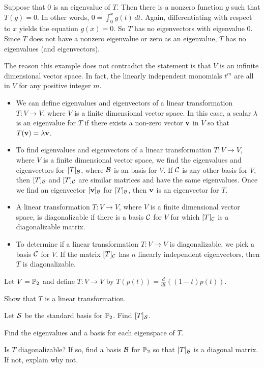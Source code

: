 \item Suppose that $0$ is an eigenvalue of $T$. Then there is a nonzero function $g$ such that $T(g) = 0$. In other words, $0 = \int_0^x g(t) \, dt$. Again, differentiating with respect to $x$ yields the equation $g(x) = 0$. So $T$ has no eigenvectors with eigenvalue $0$. Since $T$ does not have a nonzero eigenvalue or zero as an eigenvalue, $T$ has no eigenvalues (and eigenvectors). 

\item The reason this example does not contradict the statement is that $V$ is an infinite dimensional vector space. In fact, the linearly independent monomials $t^m$ are all in $V$ for any positive integer $m$. 

\ea




\label{sec:eigen_trans_summ}

\begin{itemize}
\item We can define eigenvalues and eigenvectors of a linear transformation $T : V \to V$, where $V$ is a finite dimensional vector space. In this case, a scalar $\lambda$ is an eigenvalue for $T$ if there exists a non-zero vector $\mathbf{v}$ in $V$ so that $T(\mathbf{v}) = \lambda \mathbf{v}$.   
\item To find eigenvalues and eigenvectors of a linear transformation $T : V \to V$, where $V$ is a finite dimensional vector space, we find the eigenvalues and eigenvectors for $[T]_{\mathcal{B}}$, where $\mathcal{B}$ is an basis for $V$. If $\mathcal{C}$ is any other basis for $V$, then $[T]_{\mathcal{B}}$ and $[T]_{\mathcal{C}}$ are similar matrices and have the same eigenvalues. Once we find an eigenvector $[\mathbf{v}]_{\mathcal{B}}$ for $[T]_{\mathcal{B}}$, then $\mathbf{v}$ is an eigenvector for $T$. 
\item A linear transformation $T: V \to V$, where $V$ is a finite dimensional vector space, is diagonalizable if there is a basis $\mathcal{C}$ for $V$ for which $[T]_{\mathcal{C}}$ is a diagonalizable matrix. 
\item To determine if a linear transformation $T : V \to V$ is diagonalizable, we pick a basis $\mathcal{C}$ for $V$. If the matrix $[T]_{\mathcal{C}}$ has $n$ linearly independent eigenvectors, then $T$ is diagonalizable. 
\end{itemize}

\label{sec:eigen_trans_exer}
\be
\item Let $V = \mathbb{P}_2$ and define $T: V \to V$ by $T(p(t)) = \frac{d}{dt} \left((1-t)p(t)\right)$. 
	\ba
	\item Show that $T$ is a linear transformation.
	\item Let $\mathcal{S}$ be the standard basis for $\mathbb{P}_2$. Find $[T]_{\mathcal{S}}$. 
	\item Find the eigenvalues and a basis for each eigenspace of $T$. 
	\item Is $T$ diagonalizable? If so, find a basis $\mathcal{B}$ for $\mathbb{P}_2$ so that $[T]_{\mathcal{B}}$ is a diagonal matrix. If not, explain why not. 
	\ea

